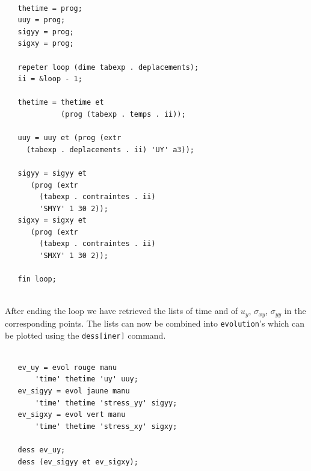\begin{castemlines}
\begin{verbatim}

   thetime = prog;
   uuy = prog;
   sigyy = prog;
   sigxy = prog;
   
   repeter loop (dime tabexp . deplacements);
   ii = &loop - 1;
   
   thetime = thetime et
             (prog (tabexp . temps . ii));
   
   uuy = uuy et (prog (extr
     (tabexp . deplacements . ii) 'UY' a3));
   
   sigyy = sigyy et 
      (prog (extr
        (tabexp . contraintes . ii)
        'SMYY' 1 30 2));
   sigxy = sigxy et 
      (prog (extr
        (tabexp . contraintes . ii)
        'SMXY' 1 30 2));
   
   fin loop;
   
\end{verbatim}
\end{castemlines}


\begin{castemcom}

After ending the loop we have retrieved the lists of time and 
of $u_y$, $\sigma_{xy}$, $\sigma_{yy}$ in the corresponding 
points. The lists can now be combined into \texttt{evolution}'s
which can be plotted using the \texttt{dess[iner]} command. 
 
\end{castemcom}
\begin{castemlines}
\begin{verbatim}

   ev_uy = evol rouge manu
       'time' thetime 'uy' uuy;
   ev_sigyy = evol jaune manu
       'time' thetime 'stress_yy' sigyy;
   ev_sigxy = evol vert manu
       'time' thetime 'stress_xy' sigxy;
   
   dess ev_uy;
   dess (ev_sigyy et ev_sigxy);

\end{verbatim}
\end{castemlines}



